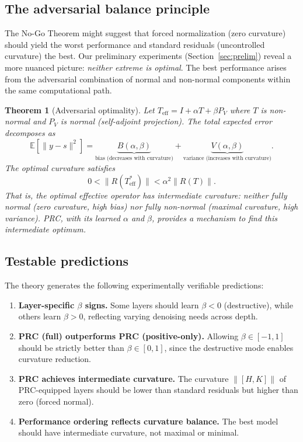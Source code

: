 \documentclass[11pt,a4paper]{article}
\newtheorem{theorem}{Theorem}[section]
\theoremstyle{definition}
\begin{document}
\subsection{The adversarial balance principle}
\label{sec:adversarial}

The No-Go Theorem might suggest that forced normalization (zero curvature)
should yield the worst performance and standard residuals (uncontrolled
curvature) the best. Our preliminary experiments (Section~\ref{sec:prelim})
reveal a more nuanced picture: \emph{neither extreme is optimal}. The best
performance arises from the adversarial combination of normal and non-normal
components within the same computational path.

\begin{theorem}[Adversarial optimality]
\label{thm:adversarial}
Let $T_{\mathrm{eff}} = I + \alpha T + \beta P_V$ where $T$ is non-normal
and $P_V$ is normal (self-adjoint projection). The total expected error
decomposes as
\[
  \mathbb{E}[\|y - s\|^2] = \underbrace{B(\alpha, \beta)}_{\text{bias (decreases with curvature)}}
  + \underbrace{V(\alpha, \beta)}_{\text{variance (increases with curvature)}}.
\]
The optimal curvature satisfies
\[
  0 < \|R(T_{\mathrm{eff}}^*)\| < \alpha^2 \|R(T)\|.
\]
That is, the optimal effective operator has \emph{intermediate} curvature:
neither fully normal (zero curvature, high bias) nor fully non-normal
(maximal curvature, high variance). PRC, with its learned $\alpha$ and $\beta$,
provides a mechanism to find this intermediate optimum.
\end{theorem}

\subsection{Testable predictions}

The theory generates the following experimentally verifiable predictions:
\begin{enumerate}[nosep]
  \item \textbf{Layer-specific $\beta$ signs.} Some layers should learn $\beta < 0$
        (destructive), while others learn $\beta > 0$, reflecting varying
        denoising needs across depth.
  \item \textbf{PRC (full) outperforms PRC (positive-only).} Allowing
        $\beta \in [-1,1]$ should be strictly better than $\beta \in [0,1]$,
        since the destructive mode enables curvature reduction.
  \item \textbf{PRC achieves intermediate curvature.} The curvature
        $\|[H,K]\|$ of PRC-equipped layers should be lower than standard
        residuals but higher than zero (forced normal).
  \item \textbf{Performance ordering reflects curvature balance.} The best
        model should have intermediate curvature, not maximal or minimal.
\end{enumerate}
\end{document}

